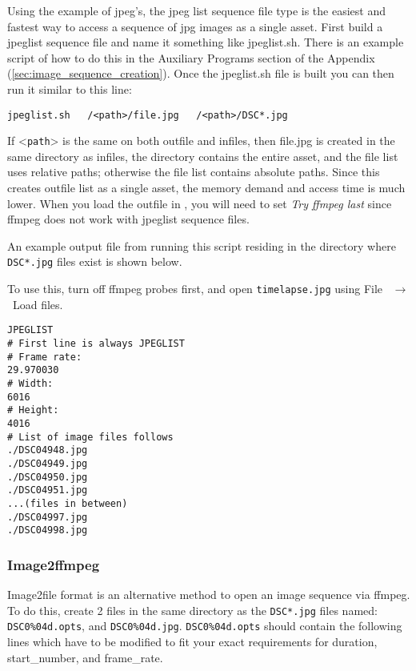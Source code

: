 Using the example of jpeg’s, the jpeg list sequence file type is the easiest and fastest way to access a sequence of jpg images as a single asset.  First build a jpeglist sequence file and name it something like jpeglist.sh.  There is an example script of how to do this in the Auxiliary Programs section of the Appendix (\ref{sec:image_sequence_creation}).  Once the jpeglist.sh file is built you can then run it similar to this line:

\begin{lstlisting}[style=sh]
jpeglist.sh   /<path>/file.jpg   /<path>/DSC*.jpg
\end{lstlisting}

\vspace*{1ex} \noindent If <\texttt{path}> is the same on both outfile and infiles, then file.jpg is created in the same directory as infiles, the directory contains the entire asset, and the file list uses relative paths; otherwise the file list contains absolute paths.   Since this creates outfile list as a single asset, the memory demand and access time is much lower.  When you load the outfile in \CGG{}, you will need to set \textit{Try ffmpeg last} since ffmpeg does not work with jpeglist sequence files.

An example output file from running this script residing in the directory where \texttt{DSC*.jpg} files exist is shown below.

To use this, turn off ffmpeg probes first, and open \texttt{timelapse.jpg} using File ~$\rightarrow$ ~Load files.

\begin{lstlisting}[style=sh,caption={Example: timelapse.jpg},captionpos=t]
JPEGLIST
# First line is always JPEGLIST
# Frame rate:
29.970030
# Width:
6016
# Height:
4016
# List of image files follows
./DSC04948.jpg
./DSC04949.jpg
./DSC04950.jpg
./DSC04951.jpg
...(files in between)
./DSC04997.jpg
./DSC04998.jpg
\end{lstlisting}

\subsubsection{Image2ffmpeg}%
\label{ssub:image2ffmpeg}

Image2file format is an alternative method to open an image sequence via ffmpeg.  To do this, create 2 files in the same directory as the \texttt{DSC*.jpg} files named:  \texttt{DSC0\%04d.opts}, and \texttt{DSC0\%04d.jpg}. 
\texttt{DSC0\%04d.opts} should contain the following lines which have to be modified to fit your exact requirements for duration, start\_number, and frame\_rate.


